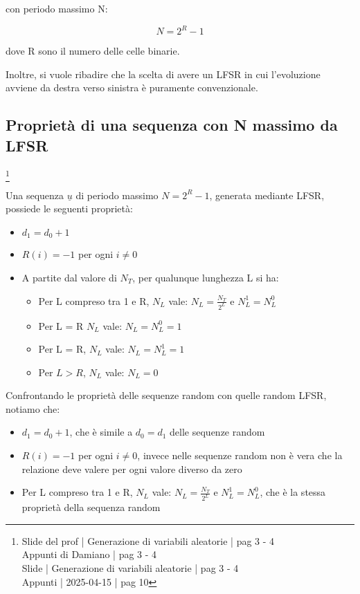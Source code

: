 con periodo massimo N: 

{
    \Large 
    \begin{equation}
        N = 2^{R} - 1
    \end{equation}
}

dove R sono il numero delle celle binarie. \newline 

Inoltre, si vuole ribadire che la scelta di avere un LFSR in cui l'evoluzione avviene da destra verso sinistra è puramente convenzionale. \newline 

\newpage 

\subsection{Proprietà di una sequenza con N massimo da LFSR}
\footnote{Slide del prof | Generazione di variabili aleatorie | pag 3 - 4 \\
Appunti di Damiano | pag 3 - 4 \\ 
Slide | Generazione di variabili aleatorie | pag  3 - 4\\ 
Appunti | 2025-04-15 | pag 10
} 

Una sequenza $\underline{u}$ di periodo massimo $N = 2^{R} - 1$, 
generata mediante LFSR, possiede le seguenti proprietà: 

\begin{itemize}
    \item $d_1 = d_0 + 1$
    \item $R(i) = - 1$ per ogni $i \neq 0$
    \item A partite dal valore di $N_T$, per qualunque lunghezza L si ha: 
    \begin{itemize}
        \item Per L compreso tra 1 e R, $N_L$ vale: $N_L = \frac{N_T}{2^{L}}$ e $N_L^{1} = N_L^{0}$
        \item Per L = R  $N_L$ vale: $N_L = N_L^{0} = 1$
        \item Per L = R, $N_L$ vale: $N_L = N_L^{1} = 1$
        \item Per $L > R$, $N_L$ vale: $N_L = 0$
    \end{itemize}
\end{itemize}

Confrontando le proprietà delle sequenze random con quelle random LFSR, 
notiamo che: 

\begin{itemize}
    \item $d_1 = d_0 + 1$, che è simile a $d_0 = d_1$ delle sequenze random 
    \item $R(i) = - 1$ per ogni $i \neq 0$, invece nelle sequenze random non è vera che la relazione deve valere per ogni valore diverso da zero 
    \item Per L compreso tra 1 e R, $N_L$ vale: $N_L = \frac{N_T}{2^{L}}$ e $N_L^{1} = N_L^{0}$, che è la stessa proprietà della sequenza random
\end{itemize}

